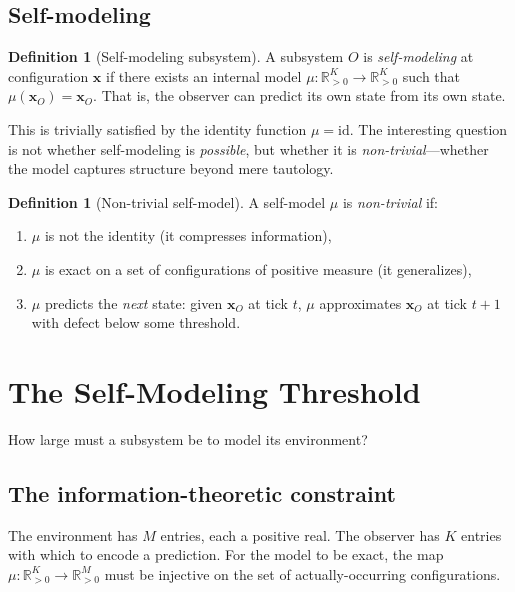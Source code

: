 \documentclass[11pt,a4paper]{article}
\theoremstyle{plain}
\theoremstyle{definition}
\newtheorem{definition}[theorem]{Definition}
\theoremstyle{remark}
\newcommand{\Rp}{\mathbb{R}_{>0}}
\begin{document}
\subsection{Self-modeling}

\begin{definition}[Self-modeling subsystem]
\label{def:self-model}
A subsystem $O$ is \emph{self-modeling} at configuration $\mathbf{x}$
if there exists an internal model $\mu : \Rp^K \to \Rp^K$ such that
$\mu(\mathbf{x}_O) = \mathbf{x}_O$.  That is, the observer can
predict its own state from its own state.
\end{definition}

This is trivially satisfied by the identity function $\mu = \mathrm{id}$.
The interesting question is not whether self-modeling is \emph{possible},
but whether it is \emph{non-trivial}---whether the model captures
structure beyond mere tautology.

\begin{definition}[Non-trivial self-model]
\label{def:nontrivial}
A self-model $\mu$ is \emph{non-trivial} if:
\begin{enumerate}[nosep,label=(\roman*)]
\item $\mu$ is not the identity (it compresses information),
\item $\mu$ is exact on a set of configurations of positive measure
  (it generalizes),
\item $\mu$ predicts the \emph{next} state: given $\mathbf{x}_O$ at
  tick $t$, $\mu$ approximates $\mathbf{x}_O$ at tick $t+1$ with
  defect below some threshold.
\end{enumerate}
\end{definition}

\section{The Self-Modeling Threshold}
\label{sec:threshold}

How large must a subsystem be to model its environment?

\subsection{The information-theoretic constraint}

The environment has $M$ entries, each a positive real.  The observer
has $K$ entries with which to encode a prediction.  For the model to
be exact, the map $\mu : \Rp^K \to \Rp^M$ must be injective on the
set of actually-occurring configurations.
\end{document}
